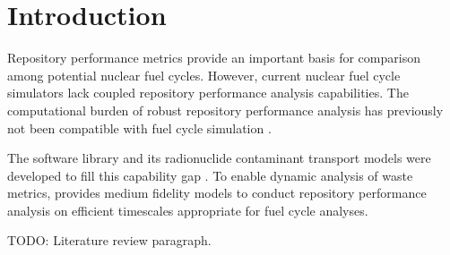\section{Introduction}\label{sec:introduction}
Repository performance metrics provide an important basis for comparison among 
potential nuclear fuel cycles. However, current nuclear fuel cycle simulators 
lack coupled repository performance analysis capabilities.  The computational 
burden of robust repository performance analysis has previously not been 
compatible with fuel cycle simulation \cite{huff_functions_2011}.

The \Cyder software library and its radionuclide contaminant transport models 
were  developed to fill this capability gap \cite{huff_cyder_2013}. 
To enable dynamic analysis of waste metrics, \Cyder provides medium fidelity 
models to conduct repository performance analysis on efficient timescales 
appropriate for fuel cycle analyses.

TODO: Literature review paragraph.
